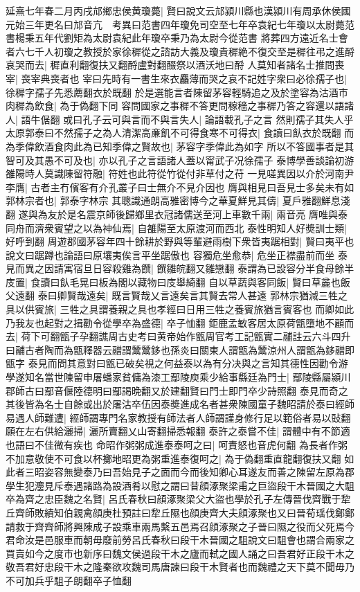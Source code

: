 延熹七年春二月丙戌邟鄉忠侯黄瓊薨|{
	賢曰說文云邟潁川縣也漢潁川有周承休侯國元始三年更名曰邟音亢　考異曰范書四年瓊免司空至七年卒袁紀七年瓊以太尉薨范書楊秉五年代劉矩為太尉袁紀此年瓊卒秉乃為太尉今從范書}
將葬四方遠近名士會者六七千人初瓊之教授於家徐穉從之諮訪大義及瓊貴穉絶不復交至是穉往弔之進酹哀哭而去|{
	穉直利翻復扶又翻酹盧對翻醊祭以酒沃地曰酹}
人莫知者諸名士推問喪宰|{
	喪宰典喪者也}
宰曰先時有一書生來衣麤薄而哭之哀不記姓字衆曰必徐孺子也|{
	徐穉字孺子先悉薦翻衣於既翻}
於是選能言者陳留茅容輕騎追之及於塗容為沽酒市肉穉為飲食|{
	為于偽翻下同}
容問國家之事穉不答更問稼穡之事穉乃答之容還以語諸人|{
	語牛倨翻}
或曰孔子云可與言而不與言失人|{
	論語載孔子之言}
然則孺子其失人乎太原郭泰曰不然孺子之為人清潔高亷飢不可得食寒不可得衣|{
	食讀曰飤衣於既翻}
而為季偉飲酒食肉此為已知季偉之賢故也|{
	茅容字季偉此為如字}
所以不答國事者是其智可及其愚不可及也|{
	亦以孔子之言語諸人蓋以甯武子况徐孺子}
泰博學善談論初游雒陽時人莫識陳留符融|{
	符姓也此符從竹從付非草付之苻}
一見嗟異因以介於河南尹李膺|{
	古者主冇儐客有介孔叢子曰士無介不見介因也}
膺與相見曰吾見士多矣未有如郭林宗者也|{
	郭泰字林宗}
其聰識通朗高雅密博今之華夏鮮見其儔|{
	夏戶雅翻鮮息淺翻}
遂與為友於是名震京師後歸鄉里衣冠諸儒送至河上車數千兩|{
	兩音亮}
膺唯與泰同舟而濟衆賓望之以為神仙焉|{
	自雒陽至太原渡河而西北}
泰性明知人好奬訓士類|{
	好呼到翻}
周遊郡國茅容年四十餘耕於野與等輩避雨樹下衆皆夷踞相對|{
	賢曰夷平也說文曰踞蹲也論語曰原壤夷俟言平坐踞傲也}
容獨危坐愈恭|{
	危坐正襟盡前而坐}
泰見而異之因請寓宿旦日容殺雞為饌|{
	饌雛皖翻又雛戀翻}
泰謂為已設容分半食母餘半庋置|{
	食讀曰飤毛晃曰板為閣以藏物曰庋舉綺翻}
自以草蔬與客同飯|{
	賢曰草麄也飯父遠翻}
泰曰卿賢哉遠矣|{
	既言賢哉乂言遠矣言其賢去常人甚遠}
郭林宗猶減三牲之具以供賓旅|{
	三牲之具謂養親之具也孝經曰日用三牲之養賓旅猶言賓客也}
而卿如此乃我友也起對之揖勸令從學卒為盛德|{
	卒子恤翻}
鉅鹿孟敏客居太原荷甑墮地不顧而去|{
	荷下可翻甑子孕翻譙周古史考曰黄帝始作甑周官考工記甑實二鬴註云六斗四升曰鬴古者陶而為甑釋器云䰝謂鬵鬵鉹也孫炎曰關東人謂甑為鬵涼州人謂甑為鉹䰝即甑字}
泰見而問其意對曰甑已破矣視之何益泰以為有分决與之言知其德性因勸令游學遂知名當世陳留申屠蟠家貧傭為漆工鄢陵庾乘少給事縣廷為門士|{
	鄢陵縣屬潁川郡師古曰鄢音偃陸德明曰鄢謁晩翻又於建翻賢曰門士即門卒少詩照翻}
泰見而奇之其後皆為名士自餘或出於屠沽卒伍因泰奬進成名者甚衆陳國童子魏昭請於泰曰經師易遇人師難遭|{
	經師謂專門名家教授有師法者人師謂謹身修行足以範俗者易以䜴翻}
願在左右供給灑掃|{
	灑所賣翻乂山寄翻掃悉報翻}
泰許之泰嘗不佳|{
	謂體中有不節適也語曰不佳微有疾也}
命昭作粥粥成進泰泰呵之曰|{
	呵責怒也音虎何翻}
為長者作粥不加意敬使不可食以杯擲地昭更為粥重進泰復呵之|{
	為于偽翻重直龍翻復扶又翻}
如此者三昭姿容無變泰乃曰吾始見子之面而今而後知卿心耳遂友而善之陳留左原為郡學生犯灋見斥泰遇諸路為設酒肴以慰之謂曰昔顔涿聚梁甫之巨盜段干木晉國之大駔卒為齊之忠臣魏之名賢|{
	呂氏春秋曰顔涿聚梁父大盜也學於孔子左傳晉伐齊戰于犂丘齊師敗績知伯親禽顔庚杜預註曰犂丘隰也顔庚齊大夫顔涿聚也又曰晉荀瑶伐鄭鄭請救于齊齊師將興陳成子設乘車兩馬繫五邑焉召顔涿聚之子晉曰隰之役而父死焉今君命汝是邑服車而朝毋廢前勞呂氏春秋曰段干木晉國之駔說文曰駔會也謂合兩家之買賣如今之度市也新序曰魏文侯過段干木之廬而軾之國人誦之曰吾君好正段干木之敬吾君好忠段干木之隆秦欲攻魏司馬唐諫曰段干木賢者也而魏禮之天下莫不聞毋乃不可加兵乎駔子朗翻卒子恤翻}
